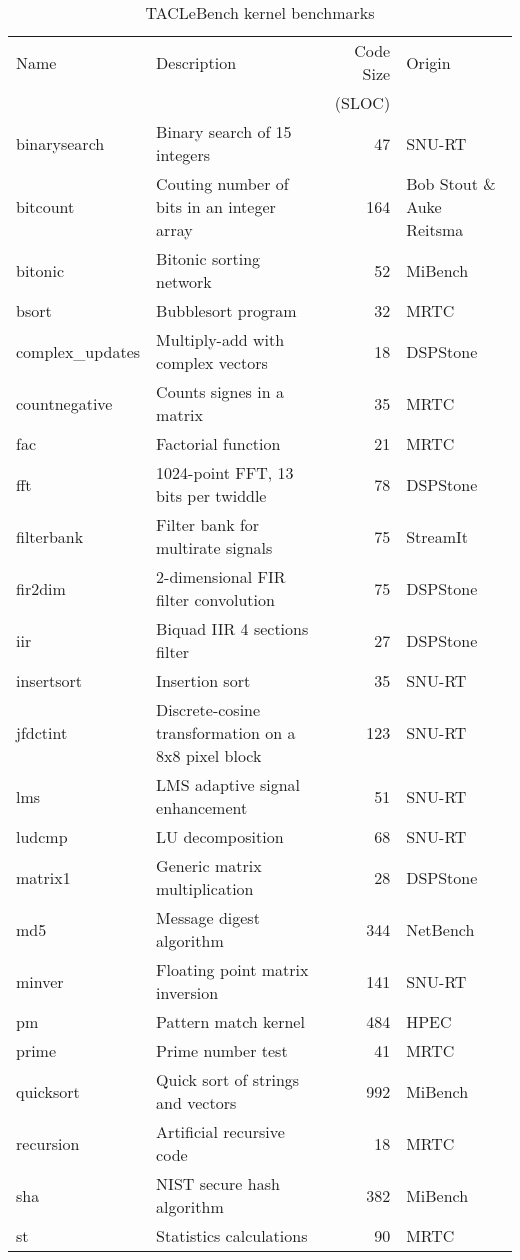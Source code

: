 \documentclass[a4paper,UKenglish]{oasics-v2016}
\begin{document}
\begin{table}[t!]
\centering
\caption{\label{tab:bench_kernel}TACLeBench kernel benchmarks}
\begin{tabular}{lL{5.5cm}rR{2.5cm}}
\toprule
Name & Description & Code Size & Origin\\
     &             &     (SLOC) & \\ \midrule
binarysearch & Binary search of 15 integers & 47 & SNU-RT \\
bitcount & Couting number of bits in an integer array & 164  & Bob Stout \& Auke Reitsma\\
bitonic &  Bitonic sorting network  & 52 & MiBench \\
bsort & Bubblesort program & 32 & MRTC \\
complex\_updates &  Multiply-add with complex vectors & 18 & DSPStone \\
countnegative &  Counts signes in a matrix  & 35 & MRTC \\
fac &  Factorial function & 21 & MRTC \\
fft &  1024-point FFT, 13 bits per twiddle  & 78  & DSPStone \\
filterbank & Filter bank for multirate signals  & 75 & StreamIt \\
fir2dim &  2-dimensional FIR filter convolution & 75 & DSPStone \\
iir &  Biquad IIR 4 sections filter & 27 & DSPStone \\
insertsort & Insertion sort & 35 & SNU-RT \\
jfdctint & Discrete-cosine transformation on a 8x8 pixel block  & 123  & SNU-RT \\
lms &  LMS adaptive signal enhancement  & 51  & SNU-RT \\
ludcmp & LU decomposition & 68 & SNU-RT \\
matrix1 &  Generic matrix multiplication  & 28 & DSPStone \\
md5 &  Message digest algorithm & 344  & NetBench \\
minver & Floating point matrix inversion  & 141  & SNU-RT \\
pm & Pattern match kernel & 484  & HPEC \\
prime &  Prime number test  & 41 & MRTC \\
quicksort &  Quick sort of strings and  vectors & 992 & MiBench \\
recursion &  Artificial recursive code  & 18 & MRTC \\
sha &  NIST secure hash algorithm & 382  & MiBench \\
st & Statistics calculations & 90  & MRTC \\
\bottomrule
\end{tabular}
\end{table}
\end{document}
